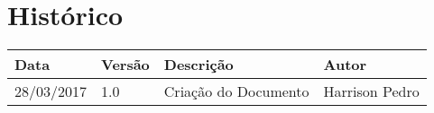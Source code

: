 \chapter{Histórico}

\begin{tabular}{ |p{3cm}|p{3cm}|p{3cm}|p{3cm}|  }
 \hline
 Data 		& 		Versão & 		Descrição 			& 		Autor\\
 \hline\hline
 28/03/2017 & 		1.0    &		Criação do Documento &   	Harrison Pedro	  \\
 \hline
\end{tabular}

